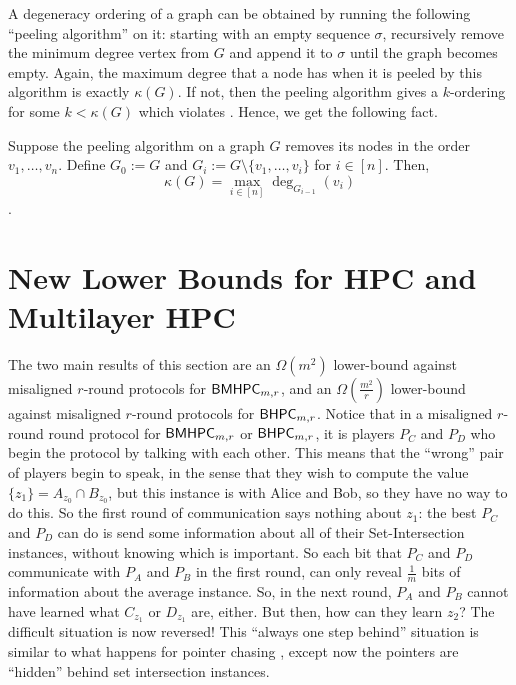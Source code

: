 \documentclass[11pt,letterpaper]{article}
\theoremstyle{definition}
\newcommand{\bhpc}{\ensuremath{\textnormal{\textsf{BHPC}}}\xspace}
\newcommand{\bmhpc}{\ensuremath{\textnormal{\textsf{BMHPC}}}\xspace}
\begin{document}
A degeneracy ordering of a graph can be obtained by running the following ``peeling algorithm'' on it: starting with an empty sequence $\sigma$, recursively remove the minimum degree vertex from $G$ and append it to $\sigma$ until the graph becomes empty. Again, the maximum degree that a node has when it is peeled by this algorithm is exactly $\kappa(G)$. If not, then the peeling algorithm gives a $k$-ordering for some $k<\kappa(G)$ which violates . Hence, we get the following fact. 


 
  

\begin{fact}\label{fact:peelingmin-degen}
Suppose the peeling algorithm on a graph $G$ removes its nodes in the order $v_1,\ldots,v_n$. Define $G_0:=G$ and $G_i:= G\setminus \{v_1,\ldots,v_i\}$ for $i\in [n]$. Then, $$\kappa(G)=\max_{i\in [n]} \deg_{G_{i-1}}(v_i)$$. 
\end{fact}





\newcommand{\bucket}[1]{\textsf{Bucket} #1}

\section{New Lower Bounds for HPC and Multilayer HPC} \label{sec:lower-bound-hpc}

The two main results of this section are an $\Omega(m^2)$ lower-bound against misaligned $r$-round protocols for $\bmhpc_{m,r}$, and an $\Omega(\frac{m^2}{r})$ lower-bound against misaligned $r$-round protocols for $\bhpc_{m,r}$. Notice that in a misaligned $r$-round round protocol for $\bmhpc_{m,r}$ or $\bhpc_{m,r}$, it is players $P_C$ and $P_D$ who begin the protocol by talking with each other. This means that the ``wrong'' pair of players begin to speak, in the sense that they wish to compute the value $\{z_1\} = A_{z_0} \cap B_{z_0}$, but this instance is with Alice and Bob, so they have no way to do this. So the first round of communication says nothing about $z_1$: the best $P_C$ and $P_D$ can do is send some information about all of their Set-Intersection instances, without knowing which is important. So each bit that $P_C$ and $P_D$ communicate with $P_A$ and $P_B$ in the first round, can only reveal $\frac 1 m$ bits of information about the average instance. So, in the next round, $P_A$ and $P_B$ cannot have learned what $C_{z_1}$ or $D_{z_1}$ are, either. But then, how can they learn $z_2$? The difficult situation is now reversed! This ``always one step behind'' situation is similar to what happens for pointer chasing \cite{NisanW93, PonzioRV99, Yehudayoff20}, except now the pointers are ``hidden'' behind set intersection instances.
\end{document}
